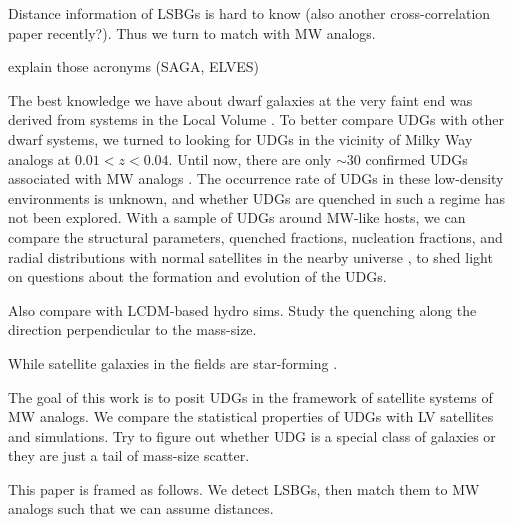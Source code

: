\documentclass[twocolumn,astrosymb,twocolappendix]{aastex631}
\begin{document}
\begin{CJK*}{UTF8}{gbsn}
Distance information of LSBGs is hard to know \citep{Kadowaki2021,Greene2022,Zaritsky2022} (also another cross-correlation paper recently?). Thus we turn to match with MW analogs.

explain those acronyms (SAGA, ELVES)

The best knowledge we have about dwarf galaxies at the very faint end was derived from systems in the Local Volume \citep[e.g.,][]{Simon2019,CarlstenELVES2022}. To better compare UDGs with other dwarf systems, we turned to looking for UDGs in the vicinity of Milky Way analogs at $0.01 < z < 0.04$. Until now, there are only $\sim 30$ confirmed UDGs associated with MW analogs \citep{Cohen2018,SAGA-II,CarlstenELVES2022}. The occurrence rate of UDGs in these low-density environments is unknown, and whether UDGs are quenched in such a regime has not been explored. With a sample of UDGs around MW-like hosts, we can compare the structural parameters, quenched fractions, nucleation fractions, and radial distributions with normal satellites in the nearby universe \citep[e.g.,][]{SAGA-II,CarlstenELVES2022}, to shed light on questions about the formation and evolution of the UDGs.

Also compare with LCDM-based hydro sims. Study the quenching along the direction perpendicular to the mass-size. 

While satellite galaxies in the fields are star-forming \citet{Geha2012}.

The goal of this work is to posit UDGs in the framework of satellite systems of MW analogs. We compare the statistical properties of UDGs with LV satellites and simulations. Try to figure out whether UDG is a special class of galaxies or they are just a tail of mass-size scatter. 

This paper is framed as follows. We detect LSBGs, then match them to MW analogs such that we can assume distances. 


\end{CJK*}
\end{document}
